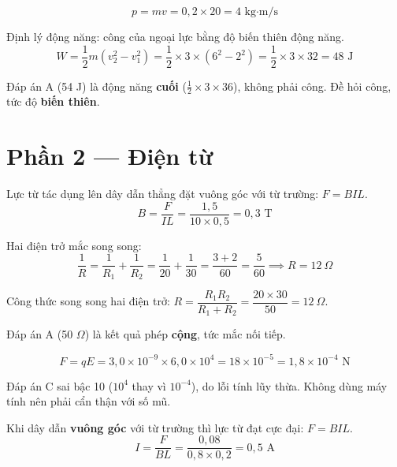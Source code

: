 \documentclass[11pt, a4paper]{article}
\begin{document}
\begin{dapan}[8 — Đáp án B]
\[
p = mv = 0{,}2 \times 20 = 4 \text{ kg·m/s}
\]
\end{dapan}

\begin{dapan}[9 — Đáp án C]
Định lý động năng: công của ngoại lực bằng độ biến thiên động năng.
\[
W = \frac{1}{2}m(v_2^2 - v_1^2) = \frac{1}{2}\times 3 \times (6^2 - 2^2) = \frac{1}{2}\times 3 \times 32 = 48 \text{ J}
\]

 Đáp án A (54 J) là động năng \textbf{cuối} ($\frac{1}{2}\times3\times36$), không phải công. Đề hỏi công, tức độ \textbf{biến thiên}.
\end{dapan}

\section{Phần 2 — Điện từ}

\begin{dapan}[10 — Đáp án A]
Lực từ tác dụng lên dây dẫn thẳng đặt vuông góc với từ trường: $F = BIL$.
\[
B = \frac{F}{IL} = \frac{1{,}5}{10 \times 0{,}5} = 0{,}3 \text{ T}
\]
\end{dapan}

\begin{dapan}[11 — Đáp án D]
Hai điện trở mắc song song:
\[
\frac{1}{R} = \frac{1}{R_1} + \frac{1}{R_2} = \frac{1}{20} + \frac{1}{30} = \frac{3+2}{60} = \frac{5}{60} \implies R = 12 \ \Omega
\]

 Công thức song song hai điện trở: $R = \dfrac{R_1 R_2}{R_1 + R_2} = \dfrac{20 \times 30}{50} = 12\ \Omega$.

 Đáp án A (50 $\Omega$) là kết quả phép \textbf{cộng}, tức mắc nối tiếp.
\end{dapan}

\begin{dapan}[12 — Đáp án B]
\[
F = qE = 3{,}0\times10^{-9} \times 6{,}0\times10^4 = 18\times10^{-5} = 1{,}8\times10^{-4} \text{ N}
\]

 Đáp án C sai bậc 10 ($10^4$ thay vì $10^{-4}$), do lỗi tính lũy thừa. Không dùng máy tính nên phải cẩn thận với số mũ.
\end{dapan}

\begin{dapan}[13 — Đáp án A]
Khi dây dẫn \textbf{vuông góc} với từ trường thì lực từ đạt cực đại: $F = BIL$.
\[
I = \frac{F}{BL} = \frac{0{,}08}{0{,}8 \times 0{,}2} = 0{,}5 \text{ A}
\]
\end{dapan}
\end{document}
